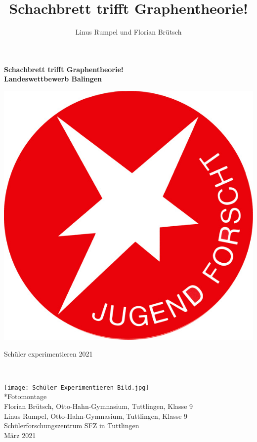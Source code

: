 \documentclass[11pt,a4paper]{article}
\author{Linus Rumpel und Florian Brütsch}
\title{Schachbrett trifft Graphentheorie!}
\numberwithin{equation}{section}
\numberwithin{table}{section}
\numberwithin{figure}{section}
\begin{document}
\vspace*{2em}
\begin{center} \Huge \bf
Schachbrett trifft Graphentheorie! \\ 
\Large
Landeswettbewerb Balingen\\
\begin{center}
\includegraphics[scale=0.6]{00.jpg} 
\end{center}

\huge
Schüler experimentieren 2021 \vspace*{1em}\\
\end{center}
\thispagestyle{empty}
~ 
\begin{center}
\texttt{[image: Schüler Experimentieren Bild.jpg]}\\
\tiny{*Fotomontage}\\
\vspace*{4em}
 \Large 
Florian Brütsch, Otto-Hahn-Gymnasium, Tuttlingen, Klasse 9\\
Linus Rumpel, Otto-Hahn-Gymnasium, Tuttlingen, Klasse 9\\
Schülerforschungszentrum SFZ in Tuttlingen \\
\vspace{1em}
\large
März 2021
\end{center}
\end{document}
